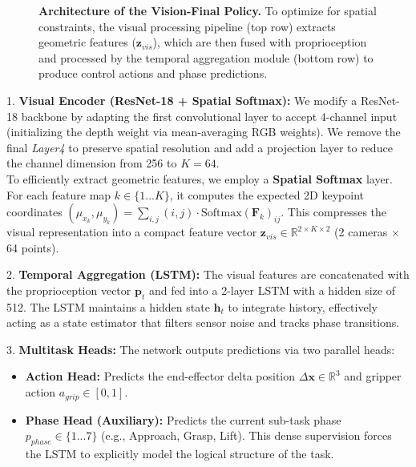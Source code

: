 \documentclass{article} %
\begin{document}
\begin{figure}[t]
\caption{\textbf{Architecture of the Vision-Final Policy.} To optimize for spatial constraints, the visual processing pipeline (top row) extracts geometric features ($\mathbf{z}_{vis}$), which are then fused with proprioception and processed by the temporal aggregation module (bottom row) to produce control actions and phase predictions.}
\label{fig:arch}
\end{figure}

1.  {\bfseries Visual Encoder (ResNet-18 + Spatial Softmax):} 
    We modify a ResNet-18 backbone by adapting the first convolutional layer to accept 4-channel input (initializing the depth weight via mean-averaging RGB weights). We remove the final \textit{Layer4} to preserve spatial resolution and add a projection layer to reduce the channel dimension from 256 to $K=64$. \\ 
    To efficiently extract geometric features, we employ a {\bfseries Spatial Softmax} layer. For each feature map $k \in \{1...K\}$, it computes the expected 2D keypoint coordinates $(\mu_{x_k}, \mu_{y_k}) = \sum_{i,j} (i, j) \cdot \text{Softmax}(\mathbf{F}_k)_{ij}$. This compresses the visual representation into a compact feature vector $\mathbf{z}_{vis} \in \mathbb{R}^{2 \times K \times 2}$ (2 cameras $\times$ 64 points).

2.  {\bfseries Temporal Aggregation (LSTM):}
    The visual features are concatenated with the proprioception vector $\mathbf{p}_t$ and fed into a 2-layer LSTM with a hidden size of 512. The LSTM maintains a hidden state $\mathbf{h}_t$ to integrate history, effectively acting as a state estimator that filters sensor noise and tracks phase transitions.

3.  \textbf{Multitask Heads:} 
    The network outputs predictions via two parallel heads:
    \begin{itemize}
        \item \textbf{Action Head:} Predicts the end-effector delta position $\Delta \mathbf{x} \in \mathbb{R}^3$ and gripper action $a_{grip} \in [0,1]$.
        \item \textbf{Phase Head (Auxiliary):} Predicts the current sub-task phase $p_{phase} \in \{1...7\}$ (e.g., Approach, Grasp, Lift). This dense supervision forces the LSTM to explicitly model the logical structure of the task.
    \end{itemize}
\end{document}
